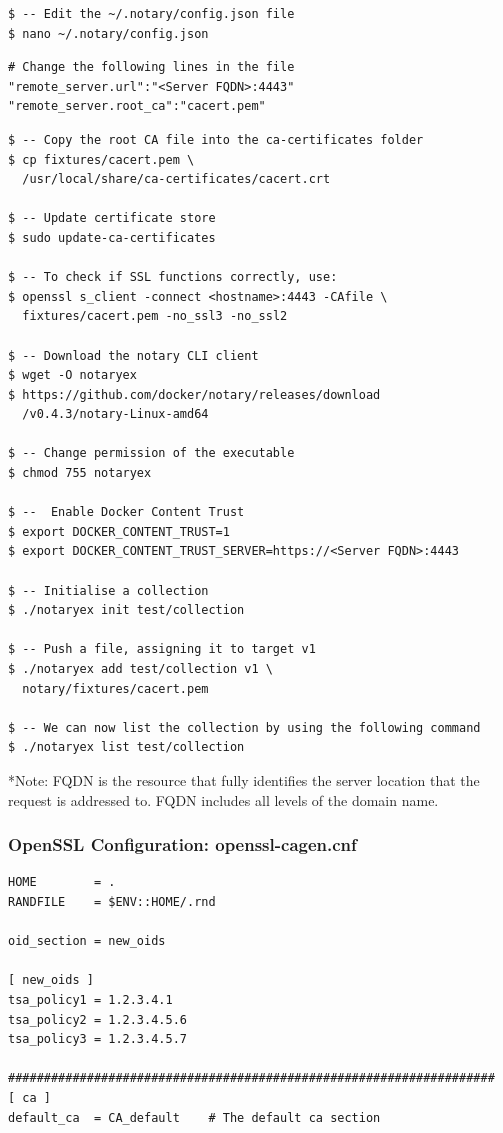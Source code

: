 \documentclass[a4paper,12pt]{article}
\begin{document}
{{\begin{verbatim}
$ -- Edit the ~/.notary/config.json file
$ nano ~/.notary/config.json
\end{verbatim}
\begin{verbatim}
# Change the following lines in the file
"remote_server.url":"<Server FQDN>:4443"
"remote_server.root_ca":"cacert.pem"
\end{verbatim}
\begin{verbatim}
$ -- Copy the root CA file into the ca-certificates folder
$ cp fixtures/cacert.pem \
  /usr/local/share/ca-certificates/cacert.crt 

$ -- Update certificate store
$ sudo update-ca-certificates

$ -- To check if SSL functions correctly, use:
$ openssl s_client -connect <hostname>:4443 -CAfile \
  fixtures/cacert.pem -no_ssl3 -no_ssl2

$ -- Download the notary CLI client
$ wget -O notaryex 
$ https://github.com/docker/notary/releases/download
  /v0.4.3/notary-Linux-amd64

$ -- Change permission of the executable
$ chmod 755 notaryex

$ --  Enable Docker Content Trust
$ export DOCKER_CONTENT_TRUST=1
$ export DOCKER_CONTENT_TRUST_SERVER=https://<Server FQDN>:4443

$ -- Initialise a collection
$ ./notaryex init test/collection

$ -- Push a file, assigning it to target v1
$ ./notaryex add test/collection v1 \
  notary/fixtures/cacert.pem

$ -- We can now list the collection by using the following command
$ ./notaryex list test/collection
\end{verbatim}
*Note: \ac{FQDN} is the resource that fully identifies the server location that the request is addressed to. \ac{FQDN} includes all levels of the domain name.
\newpage
\subsubsection{OpenSSL Configuration: openssl-cagen.cnf}
\usemintedstyle{autumn}
\begin{verbatim}
HOME		= .
RANDFILE	= $ENV::HOME/.rnd

oid_section	= new_oids

[ new_oids ]
tsa_policy1 = 1.2.3.4.1
tsa_policy2 = 1.2.3.4.5.6
tsa_policy3 = 1.2.3.4.5.7

####################################################################
[ ca ]
default_ca	= CA_default	# The default ca section


\end{verbatim}}}
\end{document}
